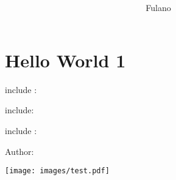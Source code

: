 \documentclass[A4paper, 12pt]{article}
\title{  }
\author{Fulano}
\begin{document}
\maketitle
\tableofcontents


\section{Hello World 1} %




include : 

include: 

include : 

Author: 

\texttt{[image: images/test.pdf]}

%
%
\end{document}
